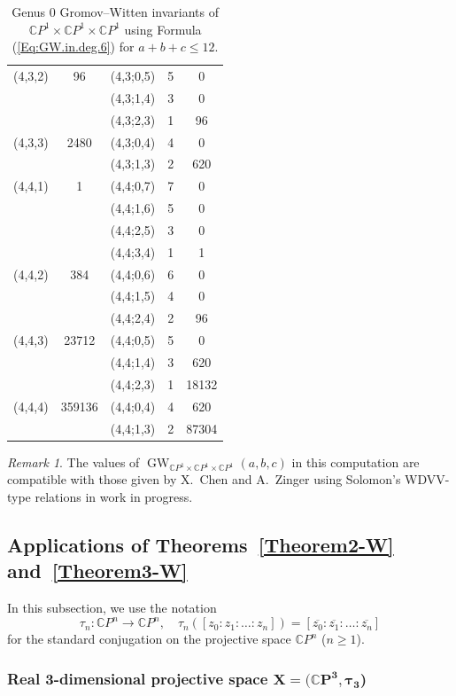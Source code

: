 \documentclass[11pt]{amsart}
\numberwithin{equation}{section}
\theoremstyle{definition}
\theoremstyle{plain}
\theoremstyle{remark}
\newtheorem{remark}[definition]{Remark}
\newcommand{\C}{\mathbb{C}}
\newcommand{\ppp}{\mathbb{C}P^1\times \mathbb{C}P^1\times \mathbb{C}P^1}
\DeclareMathOperator{\GW}{GW}
\newcommand{\lra}{\longrightarrow}
\begin{document}
\begin{table}[ht!]
\begin{tabular}{ |c|c||c|c|c|}
  \hline
     (4,3,2) & 96 & (4,3;0,5)&5& 0\\ 
       &  & (4,3;1,4)&3& 0\\ 
        &  & (4,3;2,3)&1& 96\\ 
 \hline
      (4,3,3) & 2480 & (4,3;0,4)&4& 0\\ 
       &  & (4,3;1,3)&2& 620\\
 \hline
      (4,4,1) & 1 & (4,4;0,7)&7& 0\\ 
       &  & (4,4;1,6)&5& 0\\ 
        &  & (4,4;2,5)&3& 0\\ 
        &  & (4,4;3,4)&1& 1\\ 
 \hline
    (4,4,2) & 384 & (4,4;0,6)&6& 0\\ 
       &  & (4,4;1,5)&4& 0\\ 
        &  & (4,4;2,4)&2& 96\\ 
 \hline
     (4,4,3) & 23712 & (4,4;0,5)&5& 0\\ 
       &  & (4,4;1,4)&3& 620\\ 
        &  & (4,4;2,3)&1& 18132\\ 
 \hline
     (4,4,4) & 359136 & (4,4;0,4)&4& 620\\ 
       &  & (4,4;1,3)&2& 87304\\
 \hline
\end{tabular}
\caption{Genus $0$ Gromov--Witten invariants of $\C P^1 \times \C P^1 \times \C P^1$ using  Formula (\ref{Eq:GW.in.deg.6}) for $a+b+c \leq 12$.} 
\label{Tab:GW.in.deg.6}
\end{table}

\begin{remark}
  The values of $ \GW_{\ppp}(a,b,c)$ in this computation are compatible with those given by X.~Chen and A.~Zinger using Solomon's WDVV-type relations in work in progress.
\end{remark}

\subsection{Applications of Theorems~\ref{Theorem2-W} and~\ref{Theorem3-W}} \label{sect-applications.W}
In this subsection, we use the notation
$$\tau_n \colon  \C P^n \lra \C P^n , \quad \tau_n ([z_0:z_1:\dots :z_n])=[\overline{z_0}:\overline{z_1}:\dots :\overline{z_n}]$$
for the standard conjugation on the projective space $\C P^n$ ($n\geq 1$).

\subsubsection{Real 3-dimensional projective space $\boldsymbol{X=(\C P^3,\tau_3}$)}
\end{document}
